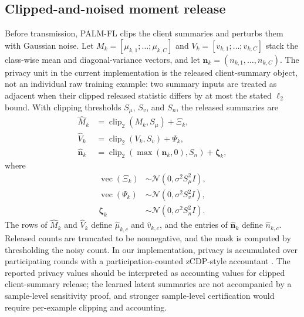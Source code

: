 \documentclass[10pt,journal]{IEEEtran}
\begin{document}
\subsection{Clipped-and-noised moment release}
Before transmission, PALM-FL clips the client summaries and perturbs them with Gaussian noise. Let $M_k=[\mu_{k,1};\ldots;\mu_{k,C}]$ and $V_k=[v_{k,1};\ldots;v_{k,C}]$ stack the class-wise mean and diagonal-variance vectors, and let $\mathbf{n}_k=(n_{k,1},\ldots,n_{k,C})$. The privacy unit in the current implementation is the released client-summary object, not an individual raw training example: two summary inputs are treated as adjacent when their clipped released statistic differs by at most the stated $\ell_2$ bound. With clipping thresholds $S_{\mu}$, $S_v$, and $S_n$, the released summaries are
\begin{align}
\widehat{M}_k &= \operatorname{clip}_2(M_k,S_{\mu}) + \Xi_k, \\
\widehat{V}_k &= \operatorname{clip}_2(V_k,S_v) + \Psi_k, \\
\widehat{\mathbf{n}}_k &=
\operatorname{clip}_2(\max(\mathbf{n}_k,0),S_n) + \boldsymbol{\zeta}_k,
\end{align}
where
\begin{align}
\operatorname{vec}(\Xi_k)&\sim\mathcal{N}(0,\sigma^2 S_{\mu}^2 I),\\
\operatorname{vec}(\Psi_k)&\sim\mathcal{N}(0,\sigma^2 S_v^2 I),\\
\boldsymbol{\zeta}_k&\sim\mathcal{N}(0,\sigma^2 S_n^2 I).
\end{align}
The rows of $\widehat{M}_k$ and $\widehat{V}_k$ define $\widehat{\mu}_{k,c}$ and $\widehat{v}_{k,c}$, and the entries of $\widehat{\mathbf{n}}_k$ define $\widehat{n}_{k,c}$. Released counts are truncated to be nonnegative, and the mask is computed by thresholding the noisy count. In our implementation, privacy is accumulated over participating rounds with a participation-counted zCDP-style accountant \cite{abadi,zcdp}. The reported privacy values should be interpreted as accounting values for clipped client-summary release; the learned latent summaries are not accompanied by a sample-level sensitivity proof, and stronger sample-level certification would require per-example clipping and accounting.
\end{document}
